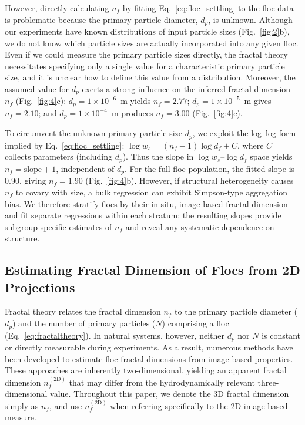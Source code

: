 \documentclass{agujournal2019}
\begin{document}
However, directly calculating $n_f$ by fitting Eq.~\eqref{eq:floc_settling} to the floc data is problematic because the primary-particle diameter, $d_p$, is unknown. Although our experiments have known distributions of input particle sizes (Fig.~\ref{fig:2}b), we do not know which particle sizes are actually incorporated into any given floc. Even if we could measure the primary particle sizes directly, the fractal theory necessitates specifying only a single value for a characteristic primary particle size, and it is unclear how to define this value from a distribution. Moreover, the assumed value for $d_p$ exerts a strong influence on the inferred fractal dimension $n_f$ (Fig.~\ref{fig:4}c): $d_p = 1\times 10^{-6}$~m yields $n_f = 2.77$; $d_p = 1\times 10^{-5}$~m gives $n_f = 2.10$; and $d_p = 1\times 10^{-4}$~m produces $n_f = 3.00$ (Fig.~\ref{fig:4}c).

To circumvent the unknown primary-particle size \(d_p\), we exploit the log–log form implied by Eq.~\eqref{eq:floc_settling}: \(\log w_s=(n_f-1)\log d_f + C\), where \(C\) collects parameters (including \(d_p\)). Thus the slope in \(\log w_s\)–\(\log d_f\) space yields \(n_f=\text{slope}+1\), independent of \(d_p\). For the full floc population, the fitted slope is \(0.90\), giving \(n_f=1.90\) (Fig.~\ref{fig:4}b). However, if structural heterogeneity causes \(n_f\) to covary with size, a bulk regression can exhibit Simpson-type aggregation bias. We therefore stratify flocs by their in situ, image-based fractal dimension and fit separate regressions within each stratum; the resulting slopes provide subgroup-specific estimates of \(n_f\) and reveal any systematic dependence on structure.

\subsection{Estimating Fractal Dimension of Flocs from 2D Projections}

Fractal theory relates the fractal dimension $n_f$ to the primary particle diameter ($d_p$) and the number of primary particles ($N$) comprising a floc (Eq.~\eqref{eq:fractaltheory}). In natural systems, however, neither $d_p$ nor $N$ is constant or directly measurable during experiments. As a result, numerous methods have been developed to estimate floc fractal dimensions from image-based properties. These approaches are inherently two-dimensional, yielding an apparent fractal dimension $n_f^{(2\mathrm{D})}$ that may differ from the hydrodynamically relevant three-dimensional value. Throughout this paper, we denote the 3D fractal dimension simply as $n_f$, and use $n_f^{(2\mathrm{D})}$ when referring specifically to the 2D image-based measure.
\end{document}
